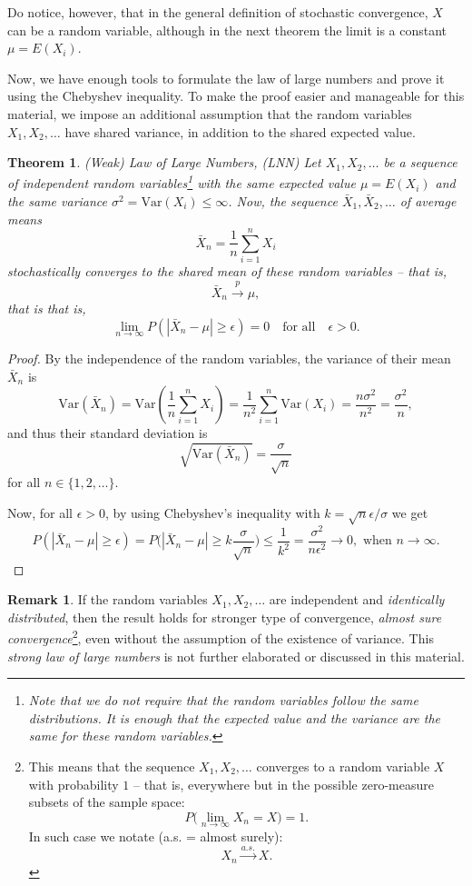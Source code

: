 \documentclass[12pt,a4paper,leqno]{report}
\newcommand{\var}{\mathrm{Var}}
\theoremstyle{plain}
\newtheorem{lause}[equation]{Theorem}
\theoremstyle{definition}
\newtheorem{remark}[equation]{Remark}
\begin{document}
Do notice, however, that in the general definition of stochastic convergence, $X$ can be a random variable, although in the next theorem the limit is a constant $\mu = E(X_i)$.

Now, we have enough tools to formulate the law of large numbers and prove it using the Chebyshev inequality. To make the proof easier and manageable for this material, we impose an additional assumption that the random variables $X_1, X_2, \dots$ have shared variance, in addition to the shared expected value.

\begin{lause}
(Weak) Law of Large Numbers, (LNN) Let $X_1, X_2, \dots$ be a sequence of independent random variables\footnote{Note that we do not require that the random variables follow the same distributions. It is enough that the expected value and the variance are the same for these random variables.} with the same expected value $\mu = E(X_i)$ and the same variance $\sigma^2 = \var(X_i) \leq \infty$. Now, the sequence $\bar{X}_1, \bar{X}_2, \dots$ of average means
\[
\bar{X}_n = \frac{1}{n} \sum_{i=1}^n X_i
\]
stochastically converges to the shared mean of these random variables -- that is,
\[
\bar{X}_n \overset{p}{\rightarrow} \mu,
\]
that is that is, 
\[
\lim_{n\rightarrow \infty}P(|\bar{X}_n - \mu| \geq \epsilon) = 0 \quad \text{for all} \quad \epsilon > 0.
\]
\end{lause}

\begin{proof} 
By the independence of the random variables, the variance of their mean $\bar{X}_n$ is
\[
\var(\bar{X}_n) = \var\left( \frac{1}{n} \sum_{i=1}^n X_i \right) = \frac{1}{n^2} \sum_{i=1}^n \var(X_i) = \frac{n\sigma^2}{n^2} = \frac{\sigma^2}{n},
\]
and thus their standard deviation is 
\[
\sqrt{\var(\bar{X}_n)} = \frac{\sigma}{\sqrt{n}}
\] for all $n \in \{1,2, \dots \}$.


Now, for all $\epsilon>0$, by using Chebyshev's inequality with $k = \sqrt{n}\epsilon / \sigma$ we get
\[
P(|\bar{X}_n - \mu| \geq \epsilon) = P\Big(|\bar{X}_n - \mu| \geq k \frac{\sigma}{\sqrt{n}}\Big) \leq \frac{1}{k^2} = \frac{\sigma^2}{n\epsilon^2} \rightarrow 0, \,\, \text{when} \,\, n \rightarrow \infty.
\]
\end{proof}

\begin{remark}
If the random variables $X_1, X_2, \dots$ are independent and \emph{identically distributed}, then the result holds for stronger type of convergence, \emph{almost sure convergence}\footnote{This means that the sequence $X_1, X_2, \dots$ converges to a random variable $X$ with probability $1$ -- that is, everywhere but in the possible zero-measure subsets of the sample space:
\[
P\big(\lim_{n\rightarrow \infty} X_n = X\big) = 1.
\]
In such case we notate (a.s. = almost surely):
\[
X_n \overset{a.s.}{\longrightarrow} X.
\]
}, even without the assumption of the existence of variance. This \emph{strong law of large numbers} is not further elaborated or discussed in this material.
\end{remark}
\end{document}
